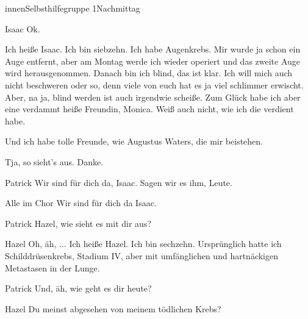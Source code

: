 \documentclass[12pt]{article}
\begin{document}
\begin{scene}[cut to]{innen}{Selbsthilfegruppe 1}{Nachmittag}
        \begin{dialog}{Isaac}
            Ok. 

            Ich heiße \gls{Isaac}.
            Ich bin siebzehn.
            Ich habe Augenkrebs.
            Mir wurde ja schon ein Auge entfernt, aber am Montag werde ich wieder operiert und das zweite Auge wird herausgenommen.
            Danach bin ich blind, das ist klar.
            Ich will mich auch nicht beschweren oder so, denn viele von euch hat es ja viel schlimmer erwischt.
            Aber, na ja, blind werden ist auch irgendwie scheiße.
            Zum Glück habe ich aber eine verdammt heiße Freundin, \gls{Monica}.
            Weiß auch nicht, wie ich die verdient habe.

            Und ich habe tolle Freunde, wie \gls{Augustus} Waters, die mir beistehen.


            Tja, so sieht's aus.
            Danke.
        \end{dialog}

        \begin{dialog}{Patrick}
            Wir sind für dich da, \gls{Isaac}.
            Sagen wir es ihm, Leute.
        \end{dialog}

        \begin{dialog}{Alle im Chor}
            Wir sind für dich da \gls{Isaac}.
        \end{dialog}

        \begin{dialog}{Patrick}
            Hazel, wie sieht es mit dir aus?
        \end{dialog}

        \begin{dialog}{Hazel}
            Oh, äh, ... Ich heiße Hazel.
            Ich bin sechzehn.
            Ursprünglich hatte ich Schilddrüsenkrebs, Stadium IV, aber mit umfänglichen und hartnäckigen Metastasen in der Lunge.
        \end{dialog}

        \begin{dialog}{Patrick}
            Und, äh, wie geht es dir heute?
        \end{dialog}

        \begin{dialog}[In Gedanken]{Hazel}
            Du meinst abgesehen von meinem tödlichen Krebs?
        \end{dialog}


\end{scene}
\end{document}
